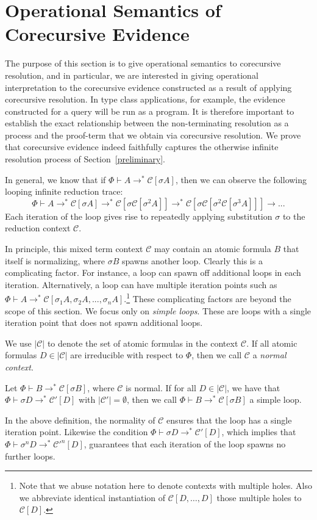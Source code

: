 \documentclass{llncs}
\begin{document}
\section{Operational Semantics of Corecursive Evidence}
\label{ob-equiv}



The purpose of this section is to give operational
semantics to corecursive resolution, and in particular, we are interested in giving 
operational interpretation to the
corecursive evidence constructed as a result of applying corecursive resolution.
In type class applications, for example, the evidence constructed for a query will be run as a program.
It is therefore important to establish the exact relationship
between the non-terminating resolution as a process and the proof-term that we obtain via corecursive resolution. We prove that corecursive evidence indeed faithfully
captures the otherwise infinite resolution process of Section~\ref{preliminary}.




In general, we know that if $\Phi \vdash A \to^* \mathcal{C}[\sigma A]$, then we can observe the following looping infinite reduction trace:
\[ \Phi \vdash A \to^* \mathcal{C}[\sigma A] \to^* \mathcal{C}[\sigma \mathcal{C}[\sigma^2 A]] \to^* \mathcal{C}[\sigma \mathcal{C}[\sigma^2 \mathcal{C}[\sigma^3 A]]] \to ... \]
Each iteration of the loop gives rise to repeatedly applying
substitution $\sigma$ to the reduction context $\mathcal{C}$. 

In principle, this mixed term context $\mathcal{C}$ may contain an atomic
formula $B$ that itself is normalizing, where $\sigma B$ spawns another loop. 
Clearly this is a complicating factor. For instance, a
loop can spawn off additional loops in each iteration. Alternatively, a loop
can have multiple iteration points such as 
$\Phi \vdash A \to^* \mathcal{C}[\sigma_1 A, \sigma_2 A, ..., \sigma_n
A]$.\footnote{Note that we abuse notation here to denote contexts with multiple holes.
Also we abbreviate identical instantiation of $\mathcal{C}[D, \ldots, D]$ those multiple holes  to $\mathcal{C}[D]$.} 
These complicating factors are beyond the scope of this section. We focus
only on \textit{simple loops}. These are loops with a single iteration point
that does not spawn additional loops.

We use $|\mathcal{C}|$ to denote the set of atomic formulas in the context
$\mathcal{C}$. If all atomic formulas $D \in |\mathcal{C}|$ are irreducible
with respect to $\Phi$, then we call $\mathcal{C}$ a \textit{normal context}. 
\begin{definition}
Let $\Phi \vdash B \to^* \mathcal{C}[\sigma B]$, where $\mathcal{C}$ is
normal. If for all $D \in |\mathcal{C}|$, we have that $\Phi \vdash \sigma D \to^*
\mathcal{C}'[D]$ with $| \mathcal{C}' | = \emptyset$, then we call $\Phi
\vdash B \to^* \mathcal{C}[\sigma B]$ a simple loop.  
 \end{definition}
In the above definition, the normality of $\mathcal{C}$ ensures that the loop
has a single iteration point. Likewise the condition $\Phi \vdash \sigma D \to^*
\mathcal{C}'[D]$, which implies that $\Phi \vdash \sigma^n D \to^*
\mathcal{C}'^n[D]$, guarantees that each iteration of the loop
spawns no further loops.
\end{document}
